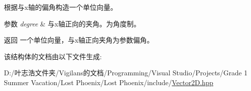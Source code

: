 根据与x轴的偏角构造一个单位向量。 


\begin{DoxyParams}{参数}
{\em degree} & 与x轴正向的夹角。为角度制。 \\
\hline
\end{DoxyParams}
\begin{DoxyReturn}{返回}
一个单位向量，与x轴正向夹角为参数偏角。 
\end{DoxyReturn}


该结构体的文档由以下文件生成\+:\begin{DoxyCompactItemize}
\item 
D\+:/叶志浩文件夹/\+Vigilans的文档/\+Programming/\+Visual Studio/\+Projects/\+Grade 1 Summer Vacation/\+Lost Phoenix/\+Lost Phoenix/include/\hyperlink{_vector2_d_8hpp}{Vector2\+D.\+hpp}\end{DoxyCompactItemize}
